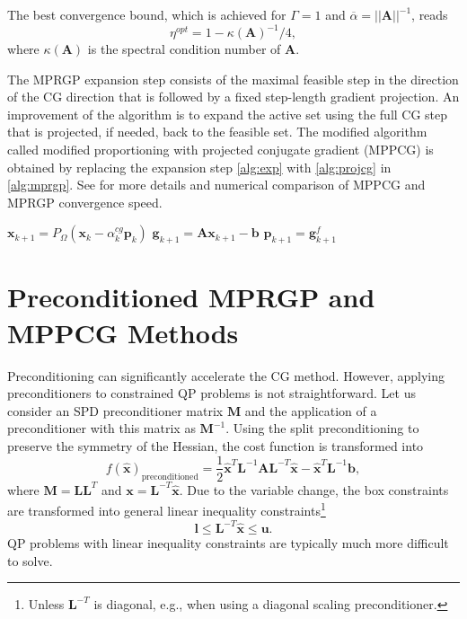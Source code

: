 \documentclass[11pt]{article}
\theoremstyle{plain}
\theoremstyle{definition}
\newcommand{\Vphi}{\bm{g}^f}
\newcommand{\Vb}{\bm{b}}
\newcommand{\Vg}{\bm{g}}
\newcommand{\Vp}{\bm{p}}
\newcommand{\Vx}{\bm{x}}
\newcommand{\MA}{\bm{A}}
\newcommand{\ML}{\bm{L}}
\newcommand{\MM}{\bm{M}}
\begin{document}
The best convergence bound, which is achieved for $\Gamma = 1$ and $\overline{\alpha} = ||\MA||^{-1}$, reads
  \begin{displaymath}
    \eta^{opt} = 1 - \kappa \left(\MA \right)^{-1}/4,
  \end{displaymath}
where $\kappa \left(\MA \right)$ is the spectral condition number of $\MA$.

The MPRGP expansion step consists of the maximal feasible step in the direction of the CG direction that is followed by a fixed step-length gradient projection.
An improvement of the algorithm is to expand the active set using the full CG step that is projected, if needed, back to the feasible set.
The modified algorithm called modified proportioning with projected conjugate gradient (MPPCG) is obtained by replacing the expansion step \cref{alg:exp} with \cref{alg:projcg} in \cref{alg:mprgp}.
See \cite{Kruzik-projmprgp19,KruzikPhD} for more details and numerical comparison of MPPCG and MPRGP convergence speed.

\begin{algorithm}[htbp]
    \SetStartEndCondition{ }{}{}%
    \DontPrintSemicolon
    \AlgoDontDisplayBlockMarkers\SetAlgoNoEnd\SetAlgoNoLine%
      $\Vx_{k+1} = P_{\Omega}(\Vx_{k} -\alpha^{cg}_k\Vp_k)$\;
      $\Vg_{k+1} = \MA \Vx_{k+1} -\Vb$\;
      $\Vp_{k+1} = \Vphi_{k+1}$\;
    \caption{Projected CG expansion step}
    \label{alg:projcg}
\end{algorithm}

\section{Preconditioned MPRGP and MPPCG Methods}
\label{sec:prec}
Preconditioning can significantly accelerate the CG method.
However, applying preconditioners to constrained QP problems is not straightforward.
Let us consider an SPD preconditioner matrix $\MM$ and the application of a preconditioner with this matrix as $\MM^{-1}$.
Using the split preconditioning to preserve the symmetry of the Hessian, the cost function is transformed into
\begin{equation*}
  f(\widehat{\Vx})_{\text{preconditioned}} = \frac{1}{2}\widehat{\bm{x}}^{T}\ML^{-1}\bm{A}\ML^{-T}\widehat{\Vx}-\widehat{\Vx}^{T}\ML^{-1}\bm{b},
\end{equation*}
where $\MM = \ML\ML^T$ and $\Vx = \ML^{-T}\widehat{\Vx}$.
Due to the variable change, the box constraints are transformed into general linear inequality constraints\footnote{Unless $\ML^{-T}$ is diagonal, e.g., when using a diagonal scaling preconditioner.}
\begin{equation*}
  \bm{l} \le \ML^{-T}\widehat{\Vx} \le \bm{u}.
\end{equation*}
QP problems with linear inequality constraints are typically much more difficult to solve.
\end{document}
